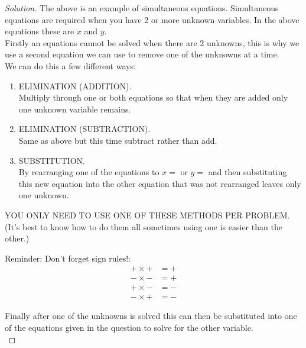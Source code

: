 \documentclass[12pt]{article}
\newenvironment{solution}{\begin{proof}[Solution]}{\end{proof}}
\begin{document}
\begin{solution} %
The above is an example of simultaneous equations. Simultaneous equations are required when you have 2 or more unknown variables. In the above equations these are $x$ and $y$. \\
Firstly an equations cannot be solved when there are 2 unknowns, this is why we use a second equation we can use to remove one of the unknowns at a time. \\
We can do this a few different ways:
\begin{enumerate}
    \item ELIMINATION (ADDITION). \\
        Multiply through one or both equations so that when they are added only one unknown variable remains. \\
    \item ELIMINATION (SUBTRACTION). \\
        Same as above but this time subtract rather than add. \\
     
    \item SUBSTITUTION. \\
        By rearranging one of the equations to $x =$ or $y =$ and then substituting this new equation into the other equation that was not rearranged leaves only one unknown. \\
\end{enumerate}

\begin{center}
    YOU ONLY NEED TO USE ONE OF THESE METHODS PER PROBLEM. \\
    (It's best to know how to do them all sometimes using one is easier than the other.)
\end{center}

Reminder: Don't forget sign rules!: \\
\begin{align*}
        + \times +  &= + \\
        - \times - &= + \\
        + \times - &= - \\
        - \times + &= -
\end{align*}

Finally after one of the  unknowns is solved this can then be substituted into one of the equations given in the question to solve for the other variable. \\


\end{solution}
\end{document}
